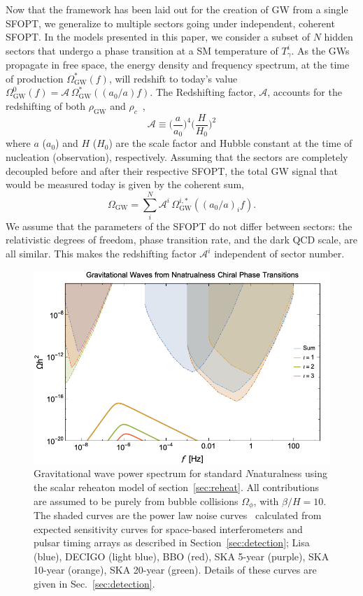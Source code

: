 \documentclass[nofootinbib,twocolumn,preprintnumbers]{revtex4-1}
\begin{document}
Now that the framework has been laid out for the creation of GW from a single SFOPT, we generalize to multiple sectors going under independent, coherent SFOPT. In the models presented in this paper, we consider a subset of $N$ hidden sectors that undergo a phase transition at a SM temperature of $T_{\gamma}^{i}$. As the GWs propagate in free space, the energy density and frequency spectrum, at the time of production $\Omega_{\textrm{GW}}^{*}(f)$, will redshift to today's value $\Omega_{\textrm{GW}}^{0}(f) = \mathcal{A}\, \Omega_{\textrm{GW}}^{*}((a_{0}/a) f) $. The Redshifting factor, $\mathcal{A}$, accounts for the redshifting of both $\rho_{\textrm{GW}} $ and $\rho_{c}$~\cite{Breitbach:2018ddu,PhysRevD.49.2837},
\begin{equation}\label{eqn::redshifting}
\mathcal{A} \equiv \bigg( \frac{a}{a_{0}} \bigg)^4 \bigg( \frac{H}{H_{0}}\bigg)^2
\end{equation}
where $a$ ($a_{0}$)  and $H$ ($H_{0}$) are the scale factor and Hubble constant at the time of nucleation (observation), respectively. Assuming that the sectors are completely decoupled before and after their respective SFOPT, the total GW signal that would be measured today is given by the coherent sum,
\begin{equation}
\Omega_{\textrm{GW}} =  \sum_{i}^{N} \mathcal{A}^{i}\, \Omega_{\textrm{GW}}^{i,*}((a_{0}/a)_{i} f) .
\end{equation}
We assume that the parameters of the SFOPT do not differ between sectors: the relativistic degrees of freedom, phase transition rate, and the dark QCD scale, are all similar. This makes the redshifting factor $\mathcal{A}^i$ independent of sector number.
\begin{figure}[h!]
\centering
\includegraphics[scale=.3]{Nnatral.png} 
\caption{ Gravitational wave power spectrum for standard $N$naturalness using the scalar reheaton model of section~\ref{sec:reheat}. All contributions are assumed to be purely from bubble collisions $\Omega_{\phi}$, with $\beta/H  = 10$.  The shaded curves are the power law noise curves~\cite{PhysRevD.88.124032} calculated from expected sensitivity curves for space-based interferometers and pulsar timing arrays as described in Section~\ref{sec:detection}; Lisa (blue), DECIGO (light blue), BBO (red), SKA 5-year (purple), SKA 10-year (orange), SKA 20-year (green). Details of these curves are given in Sec.~\ref{sec:detection}.}
\label{fig::Nnatural}
\end{figure}
\end{document}
